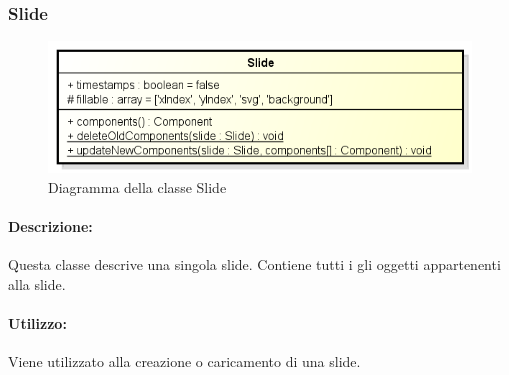 \subsubsection{Slide}

	\begin{figure}[h]
		\centering
		\includegraphics[width=0.7\linewidth]{img/back_end_premi_model_slide}
		\caption[Diagramma della classe Slide]{Diagramma della classe Slide}
		\label{fig:back_end_premi_model_slide}
	\end{figure}


	\paragraph{Descrizione:}
	Questa classe descrive una singola slide. Contiene tutti i gli oggetti appartenenti alla slide.
	
	\paragraph{Utilizzo:}
	Viene utilizzato alla creazione o caricamento di una slide.


